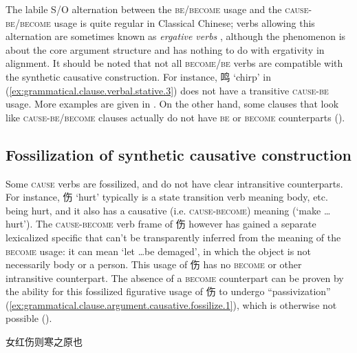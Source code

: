 \documentclass[UTF8, a4paper, oneside, scheme=plain, 12pt]{ctexrep}
\newcommand*{\citepage}[1]{p.~{#1}}
\newcommand*{\term}[1]{\emph{#1}}
\newcommand{\translate}[1]{`#1'}
\newcommand*{\category}[1]{\textsc{#1}}
\begin{document}
The labile S/O alternation between the \category{be}/\category{become} usage
and the \category{cause}-\category{be}/\category{become} usage
is quite regular in Classical Chinese;
verbs allowing this alternation are sometimes known as \term{ergative verbs}
\citep[\citepage{378}]{meiguang2018},
although the phenomenon is about the core argument structure and has nothing to do with ergativity in alignment.
It should be noted that not all \category{become}/\category{be} verbs are compatible
with the synthetic causative construction.
For instance, 鸣 \translate{chirp} in (\ref{ex:grammatical.clause.verbal.stative.3})
does not have a transitive \category{cause}-\category{be} usage.
More examples are given in \citet[\citepage{276}]{meiguang2018}.
On the other hand, some clauses that look like \category{cause}-\category{be}/\category{become} clauses
actually do not have \category{be} or \category{become} counterparts 
().

\subsection{Fossilization of synthetic causative construction}
\label{sec:grammatical.clause.verbal.argument-structure.causative.fossilization}

Some \category{cause} verbs are fossilized,
and do not have clear intransitive counterparts.
For instance, 伤 \translate{hurt} typically is a state transition verb meaning body, etc. being hurt,
and it also has a causative (i.e. \category{cause}-\category{become}) meaning
(\translate{make \dots hurt}).
The \category{cause}-\category{become} verb frame of 伤 however has gained a separate lexicalized specific that can't be transparently inferred from the meaning of the \category{become} usage:
it can mean \translate{let \dots be demaged},
in which the object is not necessarily body or a person.
This usage of 伤 has no \category{become} or other intransitive counterpart.
The absence of a \category{become} counterpart can be proven by 
the ability for this fossilized figurative usage of 伤 to undergo ``passivization'' 
(\ref{ex:grammatical.clause.argument.causative.fossilize.1}),
which is otherwise not possible ().

\begin{exe}
    \ex\label{ex:grammatical.clause.argument.causative.fossilize.1} 女红伤则寒之原也
\end{exe}
\end{document}
